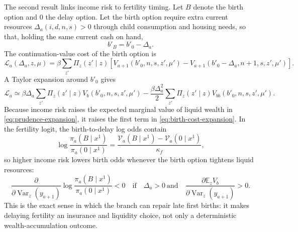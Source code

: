 \documentclass[11pt]{article}
\newcommand{\E}{\mathbb E}
\begin{document}
The second result links income risk to fertility timing. Let $B$ denote the birth option and $0$ the delay option. Let the birth option require extra current resources $\Delta_a(i,d,n,s)>0$ through child consumption and housing needs, so that, holding the same current cash on hand,
\begin{equation}
    b'_B=b'_0-\Delta_a.
\end{equation}
The continuation-value cost of the birth option is
\begin{equation}
    \mathcal L_a(\Delta_a,z,\mu)
    =
    \beta\sum_{z'}\Pi_z(z'\mid z)
    \left[
    V_{a+1}(b'_0,n,s,z',\mu')
    -
    V_{a+1}(b'_0-\Delta_a,n+1,s,z',\mu')
    \right].
    \label{eq:birth-liquidity-cost}
\end{equation}
A Taylor expansion around $b'_0$ gives
\begin{equation}
    \mathcal L_a
    \simeq
    \beta\Delta_a
    \sum_{z'}\Pi_z(z'\mid z)V_b(b'_0,n,s,z',\mu')
    -\frac{\beta\Delta_a^2}{2}
    \sum_{z'}\Pi_z(z'\mid z)V_{bb}(b'_0,n,s,z',\mu').
    \label{eq:birth-cost-expansion}
\end{equation}
Because income risk raises the expected marginal value of liquid wealth in \eqref{eq:prudence-expansion}, it raises the first term in \eqref{eq:birth-cost-expansion}. In the fertility logit, the birth-to-delay log odds contain
\begin{equation}
    \log\frac{\pi_a(B\mid x^1)}{\pi_a(0\mid x^1)}
    =
    \frac{\mathcal V_a(B\mid x^1)-\mathcal V_a(0\mid x^1)}{\kappa_f},
    \label{eq:fertility-log-odds-risk}
\end{equation}
so higher income risk lowers birth odds whenever the birth option tightens liquid resources:
\begin{equation}
    \frac{\partial}{\partial \operatorname{Var}_z(y_{a+1})}
    \log\frac{\pi_a(B\mid x^1)}{\pi_a(0\mid x^1)}
    <0
    \quad\text{if}\quad
    \Delta_a>0
    \ \text{and}\quad
    \frac{\partial \E_z V_b}{\partial \operatorname{Var}_z(y_{a+1})}>0.
    \label{eq:risk-delays-birth}
\end{equation}
This is the exact sense in which the branch can repair late first births: it makes delaying fertility an insurance and liquidity choice, not only a deterministic wealth-accumulation outcome.
\end{document}
